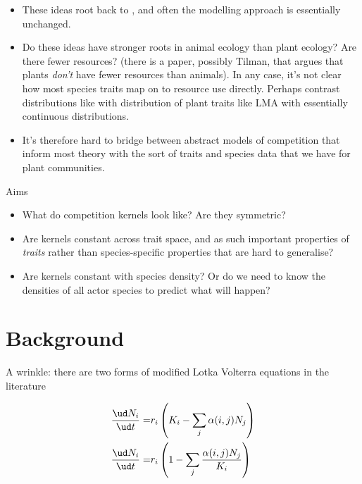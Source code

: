 \begin{itemize}
\item These ideas root back to \citet{MacArthur-1967}, and often the
  modelling approach is essentially unchanged.
\item Do these ideas have stronger roots in animal ecology than plant
  ecology?  Are there fewer resources?  (there is a paper, possibly
  Tilman, that argues that plants \emph{don't} have fewer resources
  than animals).  In any case, it's not clear how most species traits
  map on to resource use directly.  Perhaps contrast distributions
  like \citet{Hermoyian-2002} with distribution of plant traits like
  LMA with essentially continuous distributions.
\item It's therefore hard to bridge between abstract models of
  competition that inform most theory with the sort of traits and
  species data that we have for plant communities.
\end{itemize}

Aims

\begin{itemize}
\item What do competition kernels look like?  Are they symmetric?
\item Are kernels constant across trait space, and as such important
  properties of \emph{traits} rather than species-specific properties
  that are hard to generalise?
\item Are kernels constant with species density?  Or do we need to
  know the densities of all actor species to predict what will happen?
\end{itemize}

\section{Background}

A wrinkle: there are two forms of modified Lotka Volterra equations in
the literature

\begin{subequations}
  \label{eq:LV}
  \begin{align}
    \frac{\ud N_i}{\ud t} =& r_i\left(K_i  - \sum_j\alpha(i, j) N_j\right)\\
    \frac{\ud N_i}{\ud t} =&
    r_i\left(1 - \sum_j \frac{\alpha(i, j) N_j}{K_i}\right)
  \end{align}
\end{subequations}

